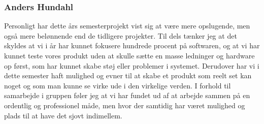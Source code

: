 \subsubsection{Anders Hundahl}
Personligt har dette års semesterprojekt vist sig at være mere opslugende, men også mere belønnende end de tidligere projekter. Til dels tænker jeg at det skyldes at vi i år har kunnet fokusere hundrede procent på softwaren, og at vi har kunnet teste vores produkt uden at skulle sætte en masse ledninger og hardware op først, som har kunnet skabe støj eller problemer i systemet. Derudover har vi i dette semester haft mulighed og evner til at skabe et produkt som reelt set kan noget og som man kunne se virke ude i den virkelige verden. I forhold til samarbejde i gruppen føler jeg at vi har fundet ud af at arbejde sammen på en ordentlig og professionel måde, men hvor der samtidig har været mulighed og plads til at have det sjovt indimellem.